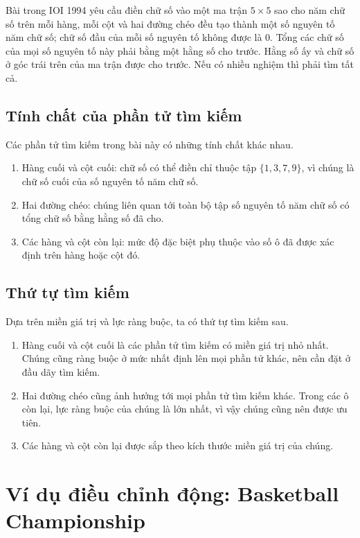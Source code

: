 \documentclass[11pt]{article}
\begin{document}
Bài  trong IOI 1994 yêu cầu điền chữ số vào một ma trận
\(5\times 5\) sao cho năm chữ số trên mỗi hàng, mỗi cột và hai đường chéo đều
tạo thành một số nguyên tố năm chữ số; chữ số đầu của mỗi số nguyên tố không
được là \(0\). Tổng các chữ số của mọi số nguyên tố này phải bằng một hằng số
cho trước. Hằng số ấy và chữ số ở góc trái trên của ma trận được cho trước.
Nếu có nhiều nghiệm thì phải tìm tất cả.

\subsection{Tính chất của phần tử tìm kiếm}

Các phần tử tìm kiếm trong bài này có những tính chất khác nhau.

\begin{enumerate}
  \item Hàng cuối và cột cuối: chữ số có thể điền chỉ thuộc tập
  \(\{1,3,7,9\}\), vì chúng là chữ số cuối của số nguyên tố năm chữ số.
  \item Hai đường chéo: chúng liên quan tới toàn bộ tập số nguyên tố năm chữ
  số có tổng chữ số bằng hằng số đã cho.
  \item Các hàng và cột còn lại: mức độ đặc biệt phụ thuộc vào số ô đã được
  xác định trên hàng hoặc cột đó.
\end{enumerate}

\subsection{Thứ tự tìm kiếm}

Dựa trên miền giá trị và lực ràng buộc, ta có thứ tự tìm kiếm sau.

\begin{enumerate}
  \item Hàng cuối và cột cuối là các phần tử tìm kiếm có miền giá trị nhỏ
  nhất. Chúng cũng ràng buộc ở mức nhất định lên mọi phần tử khác, nên cần
  đặt ở đầu dãy tìm kiếm.
  \item Hai đường chéo cũng ảnh hưởng tới mọi phần tử tìm kiếm khác. Trong
  các ô còn lại, lực ràng buộc của chúng là lớn nhất, vì vậy chúng cũng nên
  được ưu tiên.
  \item Các hàng và cột còn lại được sắp theo kích thước miền giá trị của
  chúng.
\end{enumerate}

\section{Ví dụ điều chỉnh động: Basketball Championship}
\end{document}
